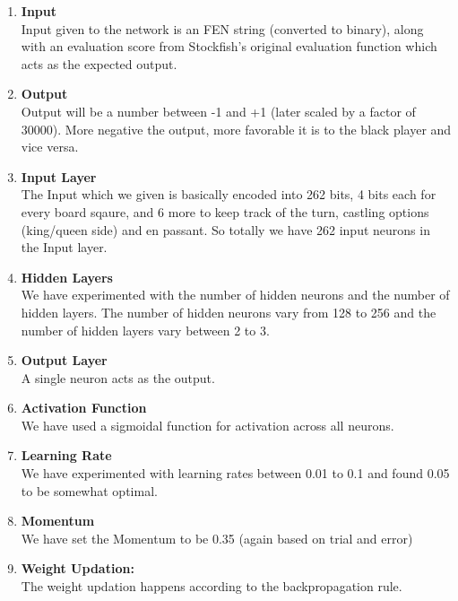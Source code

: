 \documentclass[a4paper,12pt,latin modern roman]{article}
\begin{document}
\begin{enumerate}
\item \textbf{Input}\\
Input given to the network is an FEN string (converted to binary), along with an evaluation score from Stockfish's original evaluation function which acts as the expected output. 
\item \textbf{Output}\\
Output will be a number between -1 and +1 (later scaled by a factor of 30000). More negative the output, more favorable it is to the black player and vice versa. 
\item \textbf{Input Layer}\\
The Input which we given is basically encoded into 262 bits, 4 bits each for every board sqaure, and 6 more to keep track of the turn, castling options (king/queen side) and en passant. So totally we have 262 input neurons in the Input layer. 
\item \textbf{Hidden Layers}\\
We have experimented with the number of hidden neurons and the number of hidden layers. The number of hidden neurons vary from 128 to 256 and the number of hidden layers vary between 2 to 3. 
\item \textbf{Output Layer}\\
A single neuron acts as the output. 
\item \textbf{Activation Function}\\
We have used a sigmoidal function for activation across all neurons. 
\item \textbf{Learning Rate}\\
We have experimented with learning rates between 0.01 to 0.1 and found 0.05 to be somewhat optimal.
\item \textbf{Momentum}\\
We have set the Momentum to be 0.35 (again based on trial and error)
\item \textbf{Weight Updation:}\\
The weight updation happens according to the backpropagation rule.
\end{enumerate}
\end{document}

